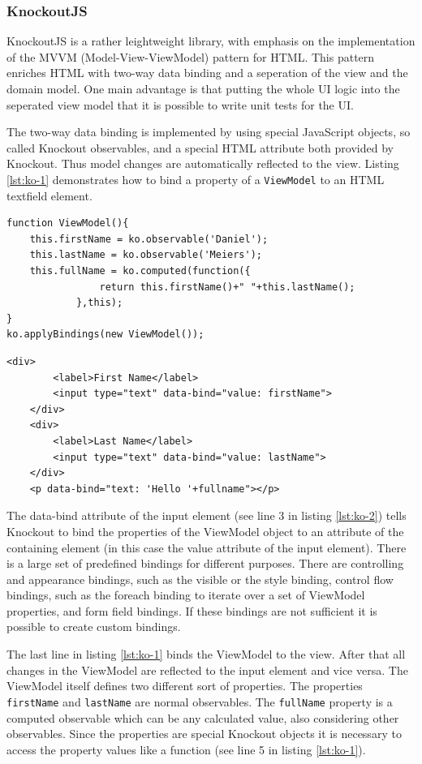 \subsubsection{KnockoutJS}

KnockoutJS is a rather leightweight library, with emphasis on the implementation of the MVVM (Model-View-ViewModel) pattern for HTML.
This pattern enriches HTML with two-way data binding and a seperation of the view and the domain model. One main advantage is that putting the whole UI logic into the seperated view model that it is possible to write unit tests for the UI.

The two-way data binding is implemented by using special JavaScript objects, so called Knockout observables, and a special HTML attribute both provided by Knockout.
Thus model changes are automatically reflected to the view.
Listing \ref{lst:ko-1} demonstrates how to bind a property of a \texttt{ViewModel} to an HTML textfield element.

\begin{lstlisting}[label=lst:ko-1,caption=the ViewModel]
function ViewModel(){
	this.firstName = ko.observable('Daniel');
	this.lastName = ko.observable('Meiers');
	this.fullName = ko.computed(function({
				return this.firstName()+" "+this.lastName();
			},this); 
}
ko.applyBindings(new ViewModel());
\end{lstlisting}

\begin{lstlisting}[label=lst:ko-2,caption=the html view]
 	<div>
		<label>First Name</label> 
		<input type="text" data-bind="value: firstName">
	</div>
	<div>
		<label>Last Name</label> 
		<input type="text" data-bind="value: lastName">
	</div>
	<p data-bind="text: 'Hello '+fullname"></p>
\end{lstlisting}

The data-bind attribute of the input element (see line 3 in listing \ref{lst:ko-2}) tells Knockout to bind the properties of the ViewModel object to an attribute of the containing element (in this case the value attribute of the input element).
There is a large set of predefined bindings for different purposes.
There are controlling and appearance bindings, such as the visible or the style binding, control flow bindings, such as the foreach binding to iterate over a set of ViewModel properties, and form field bindings.
If these bindings are not sufficient it is possible to create custom bindings.

The last line in listing \ref{lst:ko-1} binds the ViewModel to the view.
After that all changes in the ViewModel are reflected to the input element and vice versa.
The ViewModel itself defines two different sort of properties.
The properties \texttt{firstName} and \texttt{lastName} are normal observables.
The \texttt{fullName} property is a computed observable which can be any calculated value, also considering other observables.
Since the properties are special Knockout objects it is necessary to access the property values like a function (see line 5 in listing \ref{lst:ko-1}).

